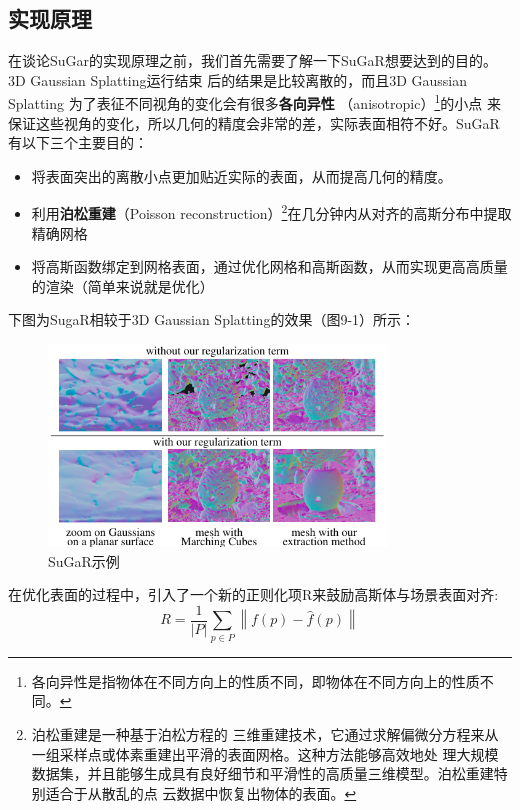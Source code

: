 \documentclass{nwputhesis}
\begin{document}
\subsection{实现原理}
在谈论SuGar的实现原理之前，我们首先需要了解一下SuGaR想要达到的目的。3D Gaussian Splatting运行结束
后的结果是比较离散的，而且3D Gaussian Splatting 为了表征不同视角的变化会有很多\textbf{各向异性}
（anisotropic）\footnote{各向异性是指物体在不同方向上的性质不同，即物体在不同方向上的性质不同。}的小点
来保证这些视角的变化，所以几何的精度会非常的差，实际表面相符不好。SuGaR有以下三个主要目的：
\begin{itemize}
    \item 将表面突出的离散小点更加贴近实际的表面，从而提高几何的精度。
    \item 利用\textbf{泊松重建}（Poisson reconstruction）\footnote{泊松重建是一种基于泊松方程的
    三维重建技术，它通过求解偏微分方程来从一组采样点或体素重建出平滑的表面网格。这种方法能够高效地处
    理大规模数据集，并且能够生成具有良好细节和平滑性的高质量三维模型。泊松重建特别适合于从散乱的点
    云数据中恢复出物体的表面。}在几分钟内从对齐的高斯分布中提取精确网格
    \item 将高斯函数绑定到网格表面，通过优化网格和高斯函数，从而实现更高高质量的渲染（简单来说就是优化）
\end{itemize}

下图为SugaR相较于3D Gaussian Splatting的效果（图9-1）所示：
\begin{figure}[H]
    \centering
    \includegraphics[width=0.8\textwidth]{picture/31.png}
    \caption{SuGaR示例}
\end{figure}

\indent
在优化表面的过程中，引入了一个新的正则化项R来鼓励高斯体与场景表面对齐:
\begin{equation}
    R = \frac{1}{|P|} \sum_{p \in P} \left\| f(p) - \hat{f}(p) \right\|
\end{equation}
\end{document}
